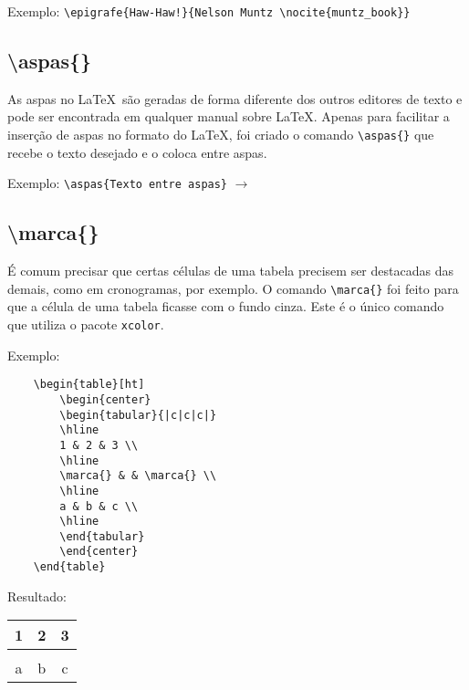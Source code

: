 \documentclass{fei}
\begin{document}
    Exemplo: \verb+\epigrafe{Haw-Haw!}{Nelson Muntz \nocite{muntz_book}}+
    
    \subsection{\textbackslash aspas\{\}}
    As aspas no \LaTeX~são geradas de forma diferente dos outros editores de texto e pode ser encontrada em qualquer manual sobre \LaTeX. Apenas para facilitar a inserção de aspas no formato do \LaTeX, foi criado o comando \verb+\aspas{}+ que recebe o texto desejado e o coloca entre aspas.

    Exemplo: \verb+\aspas{Texto entre aspas}+ $\to$ 
    
    \subsection{\textbackslash marca\{\}}
    É comum precisar que certas células de uma tabela precisem ser destacadas das demais, como em cronogramas, por exemplo. O comando \verb+\marca{}+ foi feito para que a célula de uma tabela ficasse com o fundo cinza. Este é o único comando que utiliza o pacote \texttt{xcolor}.

    Exemplo:
    \begin{verbatim}
    \begin{table}[ht]
        \begin{center}
        \begin{tabular}{|c|c|c|}
        \hline
        1 & 2 & 3 \\
        \hline
        \marca{} & & \marca{} \\
        \hline
        a & b & c \\
        \hline
        \end{tabular}
        \end{center}
    \end{table}
    \end{verbatim}
    Resultado: 
    \begin{table}[ht]
        \begin{center}
        \begin{tabular}{|c|c|c|}
        \hline
        1 & 2 & 3 \\
        \hline
        \marca{} & & \marca{} \\
        \hline
        a & b & c \\
        \hline
        \end{tabular}
        \end{center}
    \end{table}
        
\end{document}
